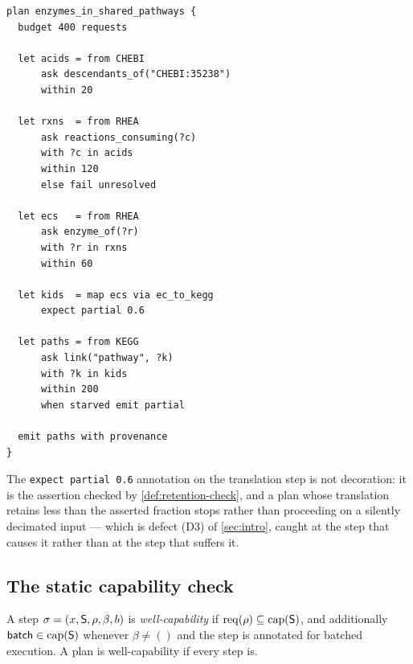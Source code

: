 \begin{example}
\label{ex:plan}
\begin{lstlisting}[caption={The question of \cref{sec:intro} as a plan. Compare \cref{lst:script}: no query text, no batching constant, explicit budget, explicit failure handling.},label=lst:plan]
plan enzymes_in_shared_pathways {
  budget 400 requests

  let acids = from CHEBI
      ask descendants_of("CHEBI:35238")
      within 20

  let rxns  = from RHEA
      ask reactions_consuming(?c)
      with ?c in acids
      within 120
      else fail unresolved

  let ecs   = from RHEA
      ask enzyme_of(?r)
      with ?r in rxns
      within 60

  let kids  = map ecs via ec_to_kegg
      expect partial 0.6

  let paths = from KEGG
      ask link("pathway", ?k)
      with ?k in kids
      within 200
      when starved emit partial

  emit paths with provenance
}
\end{lstlisting}
The \texttt{expect partial 0.6} annotation on the translation step is not
decoration: it is the assertion checked by \cref{def:retention-check}, and a
plan whose translation retains less than the asserted fraction stops rather
than proceeding on a silently decimated input --- which is defect (D3) of
\cref{sec:intro}, caught at the step that causes it rather than at the step that
suffers it.
\end{example}

\subsection{The static capability check}

\begin{definition}
\label{def:wellcap}
A step $\sigma = (x,\mathsf{S},\rho,\beta,b)$ is \emph{well-capability} if
$\mathrm{req}(\rho) \subseteq \mathrm{cap}(\mathsf{S})$, and additionally
$\textsf{batch} \in \mathrm{cap}(\mathsf{S})$ whenever $\beta \neq ()$ and the step is
annotated for batched execution. A plan is well-capability if every step is.
\end{definition}

